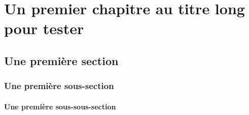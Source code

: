 

\begin{comment}

\documentclass[a4paper, 11pt, twoside, fleqn]{memoir}

\usepackage{AOCDTF}



	\openleft %

\end{comment}

	\chapter{Un premier chapitre au titre long pour tester}
	\ChapFrame %
	
	\section{Une première section}
	\lipsum[1]

	\subsection{Une première sous-section}
	\lipsum[1-3]

	\subsubsection{Une première sous-sous-section}
	\lipsum[1-2]

%

